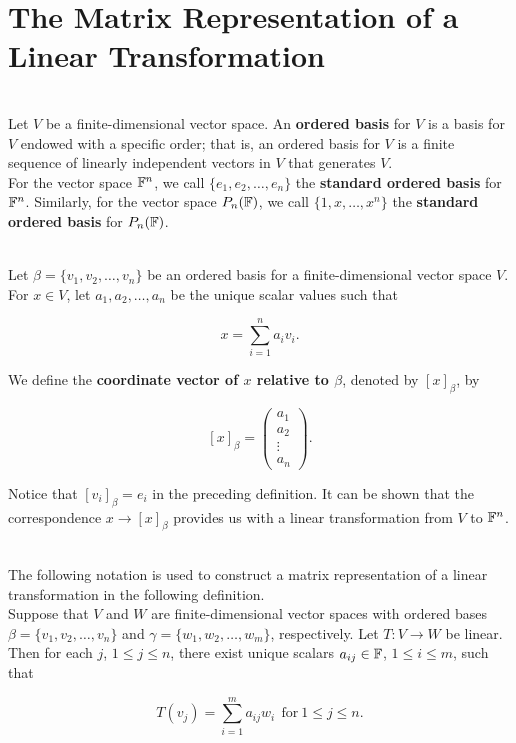 \section{The Matrix Representation of a Linear Transformation}

\begin{definition}
	\hfill\\
	Let $V$ be a finite-dimensional vector space. An \textbf{ordered basis} for $V$ is a basis for $V$ endowed with a specific order; that is, an ordered basis for $V$ is a finite sequence of linearly independent vectors in $V$ that generates $V$.\\
	
	For the vector space $\mathbb{F}^n$, we call $\{e_1, e_2, \dots, e_n\}$ the \textbf{standard ordered basis} for $\mathbb{F}^n$. Similarly, for the vector space $P_n(\mathbb{F})$, we call $\{1, x, \dots, x^n\}$ the \textbf{standard ordered basis} for $P_n(\mathbb{F})$.
\end{definition}

\begin{definition}
	\hfill\\
	Let $\beta = \{v_1, v_2, \dots, v_n\}$ be an ordered basis for a finite-dimensional vector space $V$. For $x \in V$, let $a_1, a_2, \dots, a_n$ be the unique scalar values such that
	
	\[x = \sum_{i=1}^{n}a_iv_i.\]
	
	We define the \textbf{coordinate vector of $x$ relative to $\beta$}, denoted by $[x]_\beta$, by
	
	\[[x]_\beta = \begin{pmatrix} a_1 \\ a_2 \\ \vdots \\ a_n\end{pmatrix}.\]
	
	Notice that $[v_i]_\beta = e_i$ in the preceding definition. It can be shown that the correspondence $x \to [x]_\beta$ provides us with a linear transformation from $V$ to $\mathbb{F}^n$.
\end{definition}

\begin{notation}
	\hfill\\
	The following notation is used to construct a matrix representation of a linear transformation in the following definition.\\
	
	Suppose that $V$ and $W$ are finite-dimensional vector spaces with ordered bases $\beta = \{v_1, v_2, \dots, v_n\}$ and $\gamma = \{w_1, w_2, \dots, w_m\}$, respectively. Let $T: V \to W$ be linear. Then for each $j$, $1 \leq j \leq n$, there exist unique scalars $a_{ij} \in \mathbb{F}$, $1 \leq i \leq m$, such that
	
	\[T(v_j) = \sum_{i=1}^{m}a_{ij}w_i\ \ \text{for}\ 1 \leq j \leq n.\]
\end{notation}

